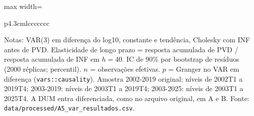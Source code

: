 \begin{table}[htbp]
\begin{adjustbox}{max width=\linewidth}
\begin{tabular}{p{4.3cm}lccccccc}
\end{tabular}
\end{adjustbox}
\begin{minipage}{0.97\linewidth}\footnotesize
\medskip Notas: VAR(3) em diferen\c{c}a do log10, constante e tend\^encia, Cholesky com INF antes de PVD. Elasticidade de longo prazo = resposta acumulada de PVD / resposta acumulada de INF em $h = 40$. IC de 90\% por bootstrap de res\'iduos (2000 r\'eplicas; percentil). $n$ = observa\c{c}\~oes efetivas. $p$ = Granger no VAR em diferen\c{c}a (\texttt{vars::causality}). Amostra 2002-2019 original: n\'iveis de 2002T1 a 2019T4; 2003-2019: n\'iveis de 2003T1 a 2019T4; 2003-2025: n\'iveis de 2003T1 a 2025T4. A DUM entra diferenciada, como no arquivo original, em A e B. Fonte: \texttt{data/processed/A5\_var\_resultados.csv}.
\end{minipage}
\end{table}

